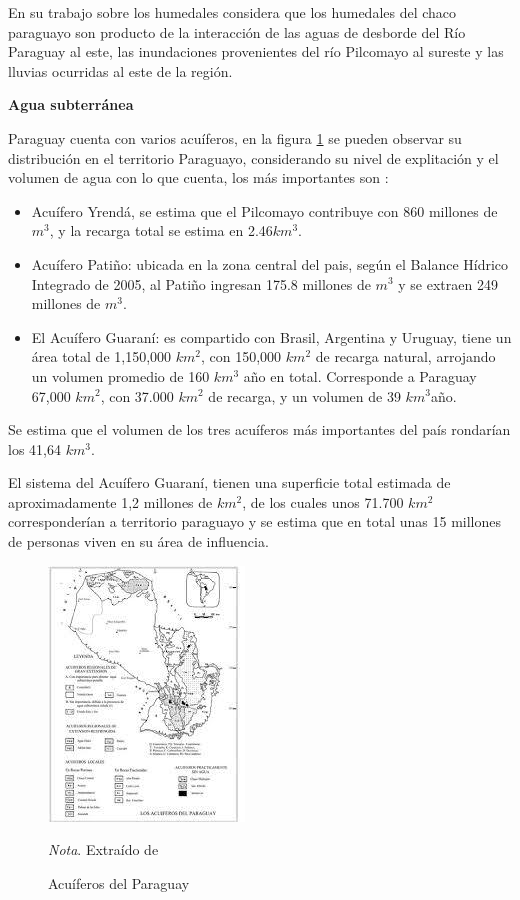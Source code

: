 En su trabajo sobre los humedales \cite{fernandez2005humedales} considera que los humedales del chaco paraguayo son producto de la interacci\'on de las aguas de desborde del R\'io Paraguay al este, las inundaciones provenientes del r\'io Pilcomayo al sureste y las lluvias ocurridas al este de la regi\'on.

\textbf{Agua subterránea}

Paraguay cuenta con varios acu\'iferos, en la figura \ref{acuiferosPy} se pueden observar su distribuci\'on en el territorio Paraguayo,  considerando su nivel de explitaci\'on y el volumen de agua con lo que cuenta, los m\'as importantes son \cite{FAO_2015}:
\begin{itemize}
    \item Acu\'ifero Yrendá, se estima que el Pilcomayo contribuye con 860 millones de $m^{3}$, y la recarga total se estima en  2.46$km^{3}$.
    \item Acu\'ifero Pati\~no: ubicada en la zona central del pais, según el Balance Hídrico Integrado de 2005, al Pati\~no ingresan 175.8 millones de $m^{3}$ y se extraen 249 millones de $m^{3}$. 
    \item El Acu\'ifero Guaran\'i: es compartido con Brasil, Argentina y 
    Uruguay, tiene un área total de 1,150,000 $km^{2}$, con 150,000 
    $km^{2}$ de recarga natural, arrojando un volumen promedio de 160 
    $km^{3}$ a\~no en total. Corresponde a Paraguay 67,000 $km^{2}$, con 
    37.000 $km^{2}$ de recarga, y un volumen de 39 $km^{3}$a\~no. 
\end{itemize}
Se estima que el volumen de los tres acu\'iferos m\'as importantes del pa\'is rondar\'ian los 41,64 $km^{3}$. \cite{alvarez-2014}

El sistema del Acuífero Guaraní, tienen una superficie total estimada de aproximadamente 1,2 millones de $km^{2}$, de los cuales unos 71.700 $km^{2}$ corresponderían a territorio paraguayo y se estima que en total unas 15 millones de personas viven en su área de influencia.\cite{salas-duenas-2015}

\begin{figure}[ht]
    \caption {Acuíferos del Paraguay} 
    \centering
    \label{acuiferosPy}
    \includegraphics[scale=1]{Imagenes/cap2/images.jpg}\\
    \bigskip
    \raggedright
    \small \textit{Nota}. Extra\'ido de \cite{alvarez-2014} 
\end{figure}

